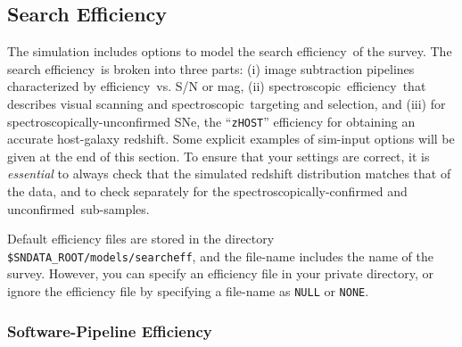 \documentclass[12pt]{article}
\newcommand{\eff}{efficiency}
\newcommand{\spec}{spectroscopic}
\newcommand{\specy}{spectroscopically}
\begin{document}
{%
   \clearpage
   \subsection{Search Efficiency }
   \label{subsec:simeff}

\newcommand{\nospec}{unconfirmed}
\newcommand{\Nospec}{Unconfirmed}

The simulation includes options to model the search \eff\
of the survey. The search \eff\ is broken into three parts:
(i) image subtraction pipelines characterized by \eff\ vs. S/N or mag,
(ii) \spec\ \eff\ that describes visual scanning and 
\spec\ targeting and selection, and 
(iii) for {\specy}-{\nospec} SNe, the ``{\tt zHOST}'' efficiency 
for obtaining an accurate host-galaxy redshift.
%
Some explicit examples of sim-input options will be given
at the end of this section.
To ensure that your settings are correct,
it is {\em essential} to always check that the
simulated redshift distribution matches that
of the data, and to check separately for the
\specy-confirmed and \nospec\ sub-samples.



Default efficiency files  are stored in the directory  
{\tt \$SNDATA\_ROOT/models/searcheff},
and the file-name includes the name of the survey.
However, you can specify an efficiency file in
your private directory, or ignore the efficiency
file by specifying a file-name as 
{\tt NULL} or {\tt NONE}.

\subsubsection{Software-Pipeline Efficiency }
\label{sss:eff_pipeline}

}
\end{document}

